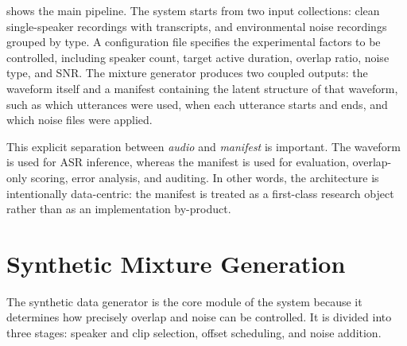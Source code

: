  shows the main pipeline. The system starts from two input collections: clean single-speaker recordings with transcripts, and environmental noise recordings grouped by type. A configuration file specifies the experimental factors to be controlled, including speaker count, target active duration, overlap ratio, noise type, and SNR. The mixture generator produces two coupled outputs: the waveform itself and a manifest containing the latent structure of that waveform, such as which utterances were used, when each utterance starts and ends, and which noise files were applied.

This explicit separation between \emph{audio} and \emph{manifest} is important. The waveform is used for ASR inference, whereas the manifest is used for evaluation, overlap-only scoring, error analysis, and auditing. In other words, the architecture is intentionally data-centric: the manifest is treated as a first-class research object rather than as an implementation by-product.

\section{Synthetic Mixture Generation}
The synthetic data generator is the core module of the system because it determines how precisely overlap and noise can be controlled. It is divided into three stages: speaker and clip selection, offset scheduling, and noise addition.

